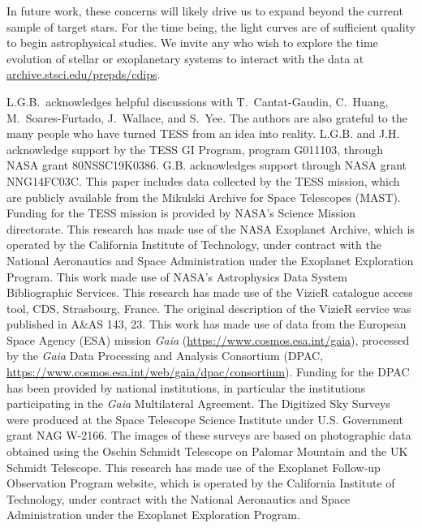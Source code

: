 \documentclass[12pt,twocolumn,tighten]{aastex62}
\newcommand{\stscilink}{\url{archive.stsci.edu/prepds/cdips}}
\begin{document}
In future work, these concerns will likely drive us to expand beyond the current
sample of target stars.  For the time being, the
light curves are of sufficient quality to begin astrophysical studies.  We
invite any who wish to explore the time evolution of stellar or
exoplanetary systems to interact with the data at \stscilink.



\acknowledgements
L.G.B.\ acknowledges helpful discussions with 
T.~Cantat-Gaudin,
C.~Huang,
M.~Soares-Furtado,
J.~Wallace, and
S.~Yee.  The authors are also
grateful to the many people who have turned TESS from an idea into
reality.
%
L.G.B. and J.H. acknowledge support by the TESS GI Program, program
G011103, through NASA grant 80NSSC19K0386.
%
G.B. acknowledges support through NASA grant NNG14FC03C.
%
This paper includes data collected by the TESS mission, which are
publicly available from the Mikulski Archive for Space Telescopes
(MAST).
%
Funding for the TESS mission is provided by NASA's Science Mission
directorate.
%
This research has made use of the NASA Exoplanet Archive, which is
operated by the California Institute of Technology, under contract
with the National Aeronautics and Space Administration under the
Exoplanet Exploration Program.
%
This work made use of NASA's Astrophysics Data System Bibliographic
Services.
%
This research has made use of the VizieR catalogue access tool, CDS,
Strasbourg, France. The original description of the VizieR service was
published in A\&AS 143, 23.
%
This work has made use of data from the European Space Agency (ESA)
mission {\it Gaia} (\url{https://www.cosmos.esa.int/gaia}), processed
by the {\it Gaia} Data Processing and Analysis Consortium (DPAC,
\url{https://www.cosmos.esa.int/web/gaia/dpac/consortium}). Funding
for the DPAC has been provided by national institutions, in particular
the institutions participating in the {\it Gaia} Multilateral
Agreement.
%
The Digitized Sky Surveys were produced at the Space Telescope Science
Institute under U.S. Government grant NAG W-2166. The images of these
surveys are based on photographic data obtained using the Oschin
Schmidt Telescope on Palomar Mountain and the UK Schmidt Telescope.
%
This research has made use of the Exoplanet Follow-up Observation
Program website, which is operated by the California Institute of
Technology, under contract with the National Aeronautics and Space
Administration under the Exoplanet Exploration Program.
%
\newline
%
\end{document}
